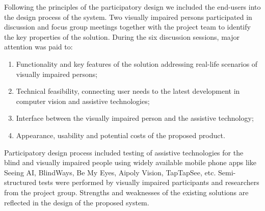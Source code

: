 \documentclass[10pt,conference,compsocconf]{IEEEtran}
\begin{document}
Following the principles of the participatory design \cite{Kensing}\cite{Carroll} we included the end-users into the design process of the system. Two visually impaired persons participated in discussion and focus group meetings together with the project team to identify the key properties of the solution. During the six discussion sessions, major attention was paid to:
\begin{enumerate}
\item Functionality and key features of the solution addressing real-life scenarios of visually impaired persons;
\item Technical feasibility, connecting user needs to the latest development in computer vision and assistive technologies;
\item Interface between the visually impaired person and the assistive technology;
\item Appearance, usability and potential costs of the proposed product. 
\end{enumerate}
Participatory design process included testing of assistive technologies for the blind and visually impaired people using widely available mobile phone apps like Seeing AI, BlindWays, Be My Eyes, Aipoly Vision, TapTapSee, etc.
Semi-structured tests were performed by visually impaired participants and researchers from the project group. Strengths and weaknesses of the existing solutions are reflected in the design of the proposed system. 
\end{document}
